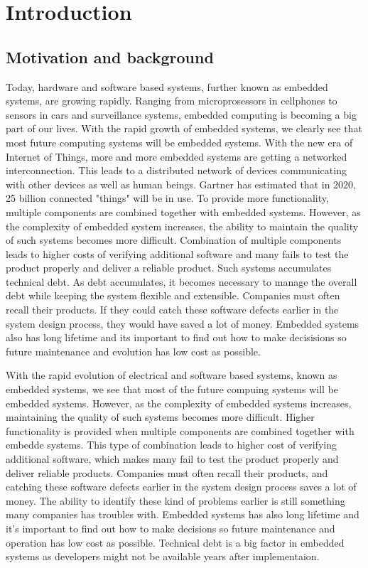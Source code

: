 \chapter{Introduction}

\section{Motivation and background}
Today, hardware and software based systems, further known as embedded systems, are growing rapidly. Ranging from microprosessors in cellphones to sensors in cars and surveillance systems, embedded computing is becoming a big part of our lives. With the rapid growth of embedded systems, we clearly see that most future computing systems will be embedded systems\cite{wolfmadsen-2000}. With the new era of Internet of Things, more and more embedded systems are getting a networked interconnection. This leads to a distributed network of devices communicating with other devices as well as human beings. Gartner has estimated that in 2020, 25 billion connected "things" will be in use\cite{gartner}. To provide more functionality, multiple components are combined together with embedded systems. However, as the complexity of embedded system increases, the ability to maintain the quality of such systems becomes more difficult. Combination of multiple components leads to higher costs of verifying additional software and many fails to test the product properly and deliver a reliable product. Such systems accumulates technical debt. As debt accumulates, it becomes necessary to manage the overall debt while keeping the system flexible and extensible. Companies must often recall their products. If they could catch these software defects earlier in the system design process, they would have saved a lot of money. Embedded systems also has long lifetime and its important to find out how to make decisisions so future maintenance and evolution has low cost as possible. 

With the rapid evolution of electrical and software based systems, known as embedded systems, we see that most of the future compuing systems will be embedded systems\cite{wolfmadsen-2000}. However, as the complexity of embedded systems increases, maintaining the quality of such systems becomes more difficult. Higher functionality is provided when multiple components are combined together with embedde systems. This type of combination leads to higher cost of verifying additional software, which makes many fail to test the product properly and deliver reliable products. Companies must often recall their products, and catching these software defects earlier in the system design process saves a lot of money. The ability to identify these kind of problems earlier is still something many companies has troubles with. Embedded systems has also long lifetime and it's important to find out how to make decisions so future maintenance and operation has low cost as possible. Technical debt is a big factor in embedded systems as developers might not be available years after implementaion. 

